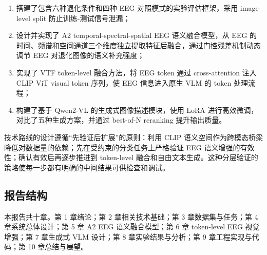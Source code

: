 \begin{enumerate}
  \item 搭建了包含六种退化条件和四种 EEG 对照模式的实验评估框架，采用 image-level split 防止训练-测试信号泄漏；
  \item 设计并实现了 A2 temporal-spectral-spatial EEG 语义融合模型，从 EEG 的时间、频谱和空间通道三个维度独立提取特征后融合，通过门控残差机制动态调节 EEG 对退化图像的语义补充强度；
  \item 实现了 VTF token-level 融合方法，将 EEG token 通过 cross-attention 注入 CLIP ViT visual token 序列，使 EEG 信息进入原生 VLM 的 token 处理流程；
  \item 构建了基于 Qwen2-VL 的生成式图像描述模块，使用 LoRA 进行高效微调，对比了五种生成方案，并通过 best-of-N reranking 提升输出质量。
\end{enumerate}

技术路线的设计遵循``先验证后扩展''的原则：利用 CLIP 语义空间作为跨模态桥梁降低对数据量的依赖；先在受约束的分类任务上严格验证 EEG 语义增强的有效性；确认有效后再逐步推进到 token-level 融合和自由文本生成。这种分层验证的策略使每一步都有明确的中间结果可供检查和调试。

\subsection{报告结构}

本报告共十章。第 1 章绪论；第 2 章相关技术基础；第 3 章数据集与任务；第 4 章系统总体设计；第 5 章 A2 EEG 语义融合模型；第 6 章 token-level EEG 视觉增强；第 7 章生成式 VLM 设计；第 8 章实验结果与分析；第 9 章工程实现与代码；第 10 章总结与展望。

